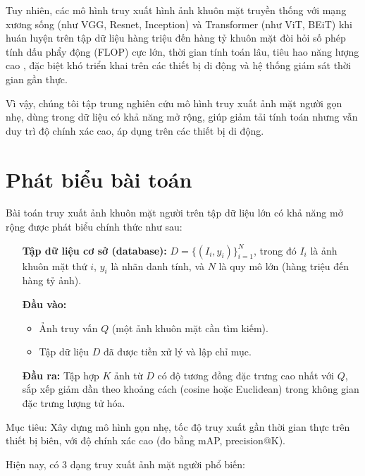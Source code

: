 Tuy nhiên, các mô hình truy xuất hình ảnh khuôn mặt truyền thống với mạng xương sống (như VGG, Resnet, Inception) và Transformer (như ViT, BEiT) khi huán luyện trên tập dữ liệu hàng triệu đến hàng tỷ khuôn mặt đòi hỏi số phép tính dấu phẩy động (FLOP) cực lớn, thời gian tính toán lâu, tiêu hao năng lượng cao \cite{yang2025hiddenjoules}, đặc biệt khó triển khai trên các thiết bị di động và hệ thống giám sát thời gian gần thực. 

Vì vậy, chúng tôi tập trung nghiên cứu mô hình truy xuất ảnh mặt người gọn nhẹ, dùng trong dữ liệu có khả năng mở rộng, giúp giảm tải tính toán nhưng vẫn duy trì độ chính xác cao, áp dụng trên các thiết bị di động. 

\section{Phát biểu bài toán}

Bài toán truy xuất ảnh khuôn mặt người trên tập dữ liệu lớn có khả năng mở rộng được phát biểu chính thức như sau:

\begin{itemize}
    \item[\textbf{Tập dữ liệu cơ sở (database):}] $ D = \{ (I_i, y_i) \}_{i=1}^N $, trong đó \( I_i \) là ảnh khuôn mặt thứ \( i \), \( y_i \) là nhãn danh tính, và \( N \) là quy mô lớn (hàng triệu đến hàng tỷ ảnh).
    \item[\textbf{Đầu vào:}] 
    \begin{itemize}
        \item Ảnh truy vấn \( Q \) (một ảnh khuôn mặt cần tìm kiếm).
        \item Tập dữ liệu \( D \) đã được tiền xử lý và lập chỉ mục.
    \end{itemize}
    \item[\textbf{Đầu ra:}] Tập hợp \( K \) ảnh từ \( D \) có độ tương đồng đặc trưng cao nhất với \( Q \), sắp xếp giảm dần theo khoảng cách (cosine hoặc Euclidean) trong không gian đặc trưng lượng tử hóa.
\end{itemize}

Mục tiêu: Xây dựng mô hình gọn nhẹ, tốc độ truy xuất gần thời gian thực trên thiết bị biên, với độ chính xác cao (đo bằng mAP, precision@K).

\medskip

Hiện nay, có 3 dạng truy xuất ảnh mặt người phổ biến:

